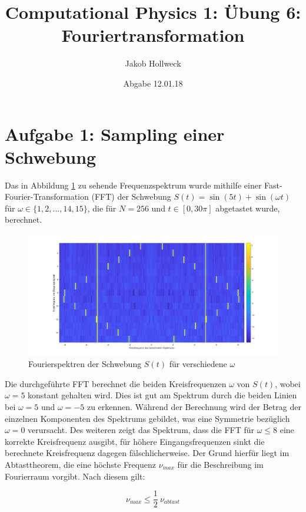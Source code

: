 \documentclass[a4paper, 10pt,onecolumn]{scrartcl}
\title{Computational Physics 1: Übung 6: Fouriertransformation}
\author{Jakob Hollweck} %
\date{Abgabe 12.01.18}
\begin{document}
\maketitle


\section*{Aufgabe 1: Sampling einer Schwebung}

Das in Abbildung \ref{Abbildung1} zu sehende Frequenzspektrum wurde mithilfe einer Fast-Fourier-Transformation (FFT) der Schwebung $S(t) = \sin(5t) + \sin(\omega t)$ für $\omega \in \{1,2,...,14,15\}$, die für $N=256$ und $t \in [0,30\pi]$ abgetastet wurde, berechnet.


\begin{figure}[ht!]
	\centering
	\includegraphics[scale=0.4,center]{sem06_1_3.png}
	\caption{Fourierspektren der Schwebung $S(t)$ für verschiedene $\omega$} 
	\label{Abbildung1}
\end{figure}

Die durchgeführte FFT berechnet die beiden Kreisfrequenzen $\omega$ von $S(t)$, wobei $\omega = 5$ konstant gehalten wird. Dies ist gut am Spektrum durch die beiden Linien bei $\omega = 5$ und $\omega = -5$ zu erkennen.
Während der Berechnung wird der Betrag der einzelnen Komponenten des Spektrums gebildet, was eine Symmetrie bezüglich $\omega = 0$ verursacht.
Des weiteren zeigt das Spektrum, dass die FFT für $\omega \leq 8$ eine korrekte Kreisfrequenz ausgibt, für höhere Eingangsfrequenzen sinkt die berechnete Kreisfrequenz dagegen fälschlicherweise.
Der Grund hierfür liegt im Abtasttheorem, die eine höchste Frequenz $\nu_{max}$ für die Beschreibung im Fourierraum vorgibt. Nach diesem gilt: 

\begin{equation}
	\nu_{max} \leq \frac{1}{2}\ \nu_{abtast}
\end{equation}
\end{document}
